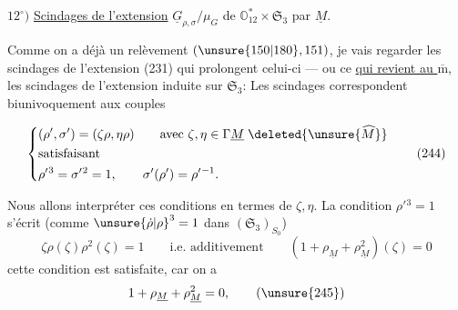 $12^\circ)$ \uline{Scindages de l'extension}
$\underline G_{\rho,\sigma}/\mu_G$ de
$\mathbb O_{12}^{*}\times\mathfrak S_3$
par $\underline M$.

Comme on a déjà un relèvement
$(\unsure{150|180},151)$, je vais regarder les scindages
de l'extension (231) qui prolongent celui-ci --- ou ce
\uline{qui revient au $\overline{\mathrm m}$}, les scindages
de l'extension induite sur $\mathfrak S_3$:
Les scindages correspondent 
biunivoquement aux couples



\[
\left\{\begin{aligned}
 &(\rho',\sigma')=(\zeta\rho,\eta\rho)
   \qquad\text{avec }\zeta,\eta\in\Gamma\underline M
   \;\deleted{\unsure{\widehat M}}\\
 &\text{satisfaisant}\\
 &\rho'{}^3=\sigma'{}^2=1,\qquad
   \sigma'(\rho')=\rho'{}^{-1}.
\end{aligned}\right.
\tag{244}
\]

Nous allons interpréter ces conditions en termes de $\zeta,\eta$.
La condition $\rho'{}^3=1$ s'écrit
(comme $\unsure{\dot\rho|\rho}^3=1$ dans $(\mathfrak S_3)_{S_0}$)
\[
\zeta\rho(\zeta)\rho^2(\zeta)=1
\qquad\text{i.e. additivement}\qquad
(1+\rho_{\underline M}+\rho_{\underline M}^2)(\zeta)=0
\tag{245}
\]
cette condition est  satisfaite, car on a
\[
1+\rho_{\underline M}+\rho_{\underline M}^2=0,
\tag{\unsure{245}}
\]

